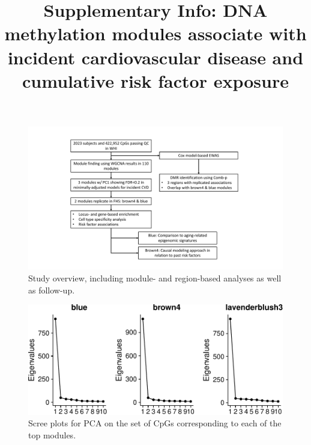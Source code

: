 \documentclass[]{article}
\title{Supplementary Info: DNA methylation modules associate with incident cardiovascular disease and cumulative risk factor exposure}
\author{}
\date{}
\begin{document}
\maketitle


\newcommand{\beginsupplement}{
  \setcounter{table}{0}  
  \renewcommand{\thetable}{S\arabic{table}} 
  \setcounter{figure}{0} 
  \renewcommand{\thefigure}{S\arabic{figure}}
}

\beginsupplement

\begin{figure}[htbp]
\centering
\includegraphics{../doc/module_ewas/workflow.pdf}
\caption{\label{fig:workflow}Study overview, including module- and
region-based analyses as well as follow-up.}
\end{figure}

\begin{figure}[htbp]
\centering
\includegraphics{../doc/module_ewas/figures/print-scree-plots-1.pdf}
\caption{\label{fig:print-scree-plots}Scree plots for PCA on the set of CpGs
corresponding to each of the top modules.}
\end{figure}
\end{document}
